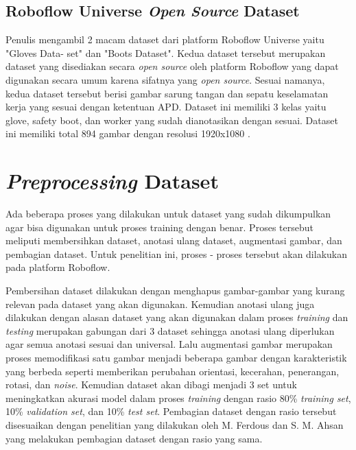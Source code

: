 \subsection{Roboflow Universe \emph{Open Source} Dataset}
\label{roboflowdataset}

Penulis mengambil 2 macam dataset dari platform Roboflow Universe yaitu "Gloves Data- set" dan "Boots Dataset". Kedua dataset tersebut merupakan dataset yang disediakan secara \emph{open source} oleh platform Roboflow yang dapat digunakan secara umum karena sifatnya yang \emph{open source}. Sesuai namanya, kedua dataset tersebut berisi gambar sarung tangan dan sepatu keselamatan kerja yang sesuai dengan ketentuan APD. Dataset ini memiliki 3 kelas yaitu glove, safety boot, dan worker yang sudah dianotasikan dengan sesuai. Dataset ini memiliki total 894 gambar dengan resolusi 1920x1080 \cite{gloves-7zhos_dataset} \cite{boots-uzihq_dataset}.

\section{\textit{Preprocessing} Dataset}
\label{sec:preprocessing}
\par Ada beberapa proses yang dilakukan untuk dataset yang sudah dikumpulkan agar bisa digunakan untuk proses training dengan benar. Proses tersebut meliputi membersihkan dataset, anotasi ulang dataset, augmentasi gambar, dan pembagian dataset. Untuk penelitian ini, proses - proses tersebut akan dilakukan pada platform Roboflow.

\par Pembersihan dataset dilakukan dengan menghapus gambar-gambar yang kurang relevan pada dataset yang akan digunakan. Kemudian anotasi ulang juga dilakukan dengan alasan dataset yang akan digunakan dalam proses \emph{training} dan \emph{testing} merupakan gabungan dari 3 dataset sehingga anotasi ulang diperlukan agar semua anotasi sesuai dan universal. Lalu augmentasi gambar merupakan proses memodifikasi satu gambar menjadi beberapa gambar dengan karakteristik yang berbeda seperti memberikan perubahan orientasi, kecerahan, penerangan, rotasi, dan \emph{noise}. Kemudian dataset akan dibagi menjadi 3 set untuk meningkatkan akurasi model dalam proses \emph{training} dengan rasio 80\% \emph{training set}, 10\% \emph{validation set}, dan 10\% \emph{test set}. Pembagian dataset dengan rasio tersebut disesuaikan dengan penelitian yang dilakukan oleh M. Ferdous dan S. M. Ahsan yang melakukan pembagian dataset dengan rasio yang sama.

